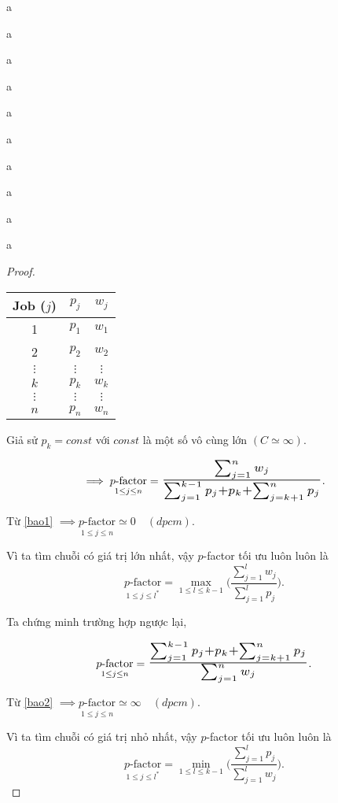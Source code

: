 \documentclass[12pt,a4paper]{report}
\begin{document}
a

a

a

a

a

a

a

a

a

a








\begin{proof}
\begin{table}[h!]
	\centering
    \begin{tabular}{| c | c | c |} 
    \hline
    Job ($j$) & $p_j$ & $w_j$ \\
    \hline
    1 & $p_1$ & $w_1$ \\
    2 & $p_2$ & $w_2$ \\
    $\vdots$ & $\vdots$ & $\vdots$ \\
    $k$ & $p_k$ & $w_k$ \\
    $\vdots$ & $\vdots$ & $\vdots$ \\
    $n$ & $p_n$ & $w_n$ \\
    \hline
    \end{tabular}
\end{table}
Giả sử $p_k = const$ với $const$ là một số vô cùng lớn $(C \simeq \infty)$.

\begin{equation} \label{bao1}
\implies \underset{1 \leq j \leq n}{p\text{-factor}} = \scalebox{1.5}{$\frac{\sum_{j=1}^{n}w_j}{\sum_{j=1}^{k-1}p_j + p_k + \sum_{j=k+1}^{n}p_j}$}. \\
\end{equation}

Từ \eqref{bao1} $\implies \underset{1 \leq j \leq n}{p\text{-factor}} \simeq 0 \quad (dpcm)$.

Vì ta tìm chuỗi có giá trị lớn nhất, vậy $p$-factor tối ưu luôn luôn là $$\underset{1 \leq j \leq l^*}{p\text{-factor}} = \underset{1 \leq l \leq k-1}{\max} \biggl(\frac{\sum_{j=1}^{l}w_j}{\sum_{j=1}^{l}p_j}\biggr).$$

Ta chứng minh trường hợp ngược lại,

\begin{equation} \label{bao2}
\underset{1 \leq j \leq n}{p\text{-factor}}
=
\scalebox{1.5}{$\frac{\sum_{j=1}^{k-1}p_j + p_k + \sum_{j=k+1}^{n}p_j}{\sum_{j=1}^{n}w_j}$}. \\
\end{equation}

Từ \eqref{bao2} $\implies \underset{1 \leq j \leq n}{p\text{-factor}} \simeq \infty \quad (dpcm)$.

Vì ta tìm chuỗi có giá trị nhỏ nhất, vậy $p$-factor tối ưu luôn luôn là $$\underset{1 \leq j \leq l^*}{p\text{-factor}} = \underset{1 \leq l \leq k-1}{\min} \biggl(\frac{\sum_{j=1}^{l}p_j}{\sum_{j=1}^{l}w_j}\biggr).$$
\end{proof}





\nocite{*}


\end{document}
